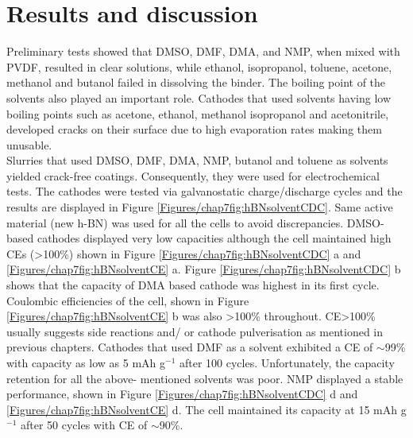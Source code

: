 \section{Results and discussion}
Preliminary tests showed that DMSO, DMF, DMA, and NMP, when mixed with PVDF, resulted in clear solutions, while ethanol, isopropanol, toluene, acetone, methanol and butanol failed in dissolving the binder. The boiling point of the solvents also played an important role. Cathodes that used solvents having low boiling points such as acetone, ethanol, methanol isopropanol and acetonitrile, developed cracks on their surface due to high evaporation rates making them unusable. \\
Slurries that used DMSO, DMF, DMA, NMP, butanol and toluene as solvents yielded crack-free coatings. Consequently, they were used for electrochemical tests. The cathodes were tested via galvanostatic charge/discharge cycles and the results are displayed in Figure \ref{Figures/chap7fig:hBNsolventCDC}. Same active material (new h-BN) was used for all the cells to avoid discrepancies. DMSO-based cathodes displayed very low capacities although the cell maintained high CEs (>100\%) shown in Figure \ref{Figures/chap7fig:hBNsolventCDC} a and \ref{Figures/chap7fig:hBNsolventCE} a.  Figure \ref{Figures/chap7fig:hBNsolventCDC} b shows that the capacity of DMA based cathode was highest in its first cycle. Coulombic efficiencies of the cell, shown in Figure \ref{Figures/chap7fig:hBNsolventCE} b was also >100\% throughout. CE>100\% usually suggests side reactions and/ or cathode pulverisation as mentioned in previous chapters. Cathodes that used DMF as a solvent exhibited a CE of $\sim$99\% with capacity as low as 5 mAh g$^{-1}$ after 100 cycles. Unfortunately, the capacity retention for all the above- mentioned solvents was poor. NMP displayed a stable performance, shown in Figure \ref{Figures/chap7fig:hBNsolventCDC} d and \ref{Figures/chap7fig:hBNsolventCE} d. The cell maintained its capacity at 15 mAh g$^{-1}$ after 50 cycles with CE of $\sim$90\%. 

